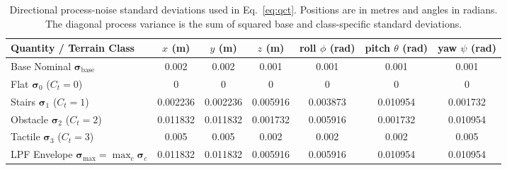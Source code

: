 \documentclass[11pt, a4paper]{article}
\begin{document}
\begin{table}[htbp]
    \centering
    \caption{Directional process-noise standard deviations used in Eq.~\eqref{eq:qct}. Positions are in metres and angles in radians. The diagonal process variance is the sum of squared base and class-specific standard deviations.}
    \label{tab:process_noise}
    \footnotesize
    \setlength{\tabcolsep}{4pt}
    \begin{tabularx}{\textwidth}{>{\raggedright\arraybackslash}X cccccc}
        \toprule
        \textbf{Quantity / Terrain Class} & $x$ (m) & $y$ (m) & $z$ (m) & roll $\phi$ (rad) & pitch $\theta$ (rad) & yaw $\psi$ (rad) \\
        \midrule
        Base Nominal $\bm{\sigma}_{\text{base}}$ & 0.002 & 0.002 & 0.001 & 0.001 & 0.001 & 0.001 \\
        Flat $\bm{\sigma}_{0}$ ($C_t=0$) & 0 & 0 & 0 & 0 & 0 & 0 \\
        Stairs $\bm{\sigma}_{1}$ ($C_t=1$) & 0.002236 & 0.002236 & 0.005916 & 0.003873 & 0.010954 & 0.001732 \\
        Obstacle $\bm{\sigma}_{2}$ ($C_t=2$) & 0.011832 & 0.011832 & 0.001732 & 0.005916 & 0.001732 & 0.010954 \\
        Tactile $\bm{\sigma}_{3}$ ($C_t=3$) & 0.005 & 0.005 & 0.002 & 0.002 & 0.002 & 0.005 \\
        \midrule
        LPF Envelope $\bm{\sigma}_{\max} = \max_c \bm{\sigma}_c$ & 0.011832 & 0.011832 & 0.005916 & 0.005916 & 0.010954 & 0.010954 \\
        \bottomrule
    \end{tabularx}
\end{table}
\end{document}

